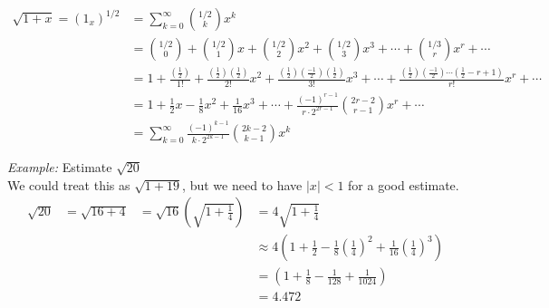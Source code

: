 \documentclass[12pt]{article}
\begin{document}
\begin{align*}
    \sqrt{1+x} =(1_x)^{1/2} &=\sum\limits_{k=0}^\infty\binom{1/2}{k}x^k\\
    &=\binom{1/2}{0}+\binom{1/2}{1}x+\binom{1/2}{2}x^2+\binom{1/2}{3}x^3+\dotsb+\binom{1/3}{r}x^r+\dotsb\\
    &=1+\frac{\left(\frac{1}{2}\right)}{1!}
    +\frac{\left(\frac{1}{2}\right)\left(\frac{1}{2}\right)}{2!}x^2+\frac{\left(\frac{1}{2}\right)\left(\frac{-1}{2}\right)\left(\frac{1}{2}\right)}{3!}x^3+\dotsb+\frac{\left(\frac{1}{2}\right)\left(\frac{-1}{2}\right)\dotsb\left(\frac{1}{2}-r+1\right)}{r!}x^r+\dotsb\\
    &=1+\frac{1}{2}x-\frac{1}{8}x^2+\frac{1}{16}x^3+\dotsb+\frac{(-1)^{r-1}}{r\cdot2^{2r-1}}\binom{2r-2}{r-1}x^r+\dotsb\\
    &=\sum\limits_{k=0}^\infty\frac{(-1)^{k-1}}{k\cdot 2^{2k-1}}\binom{2k-2}{k-1}x^k
\end{align*}

\newpage
{\sl Example:} Estimate $\sqrt{20}$\\
We could treat this as $\sqrt{1+19}$, but we need to have $|x|<1$ for a good estimate.
\begin{align*}
    \sqrt{20} &= \sqrt{16+4} &= \sqrt{16}\left(\sqrt{1+\frac{1}{4}}\right) &=4\sqrt{1+\frac{1}{4}}\\
    &&&\approx 4\left(1+\frac{1}{2}-\frac{1}{8}\left(\frac{1}{4}\right)^2+\frac{1}{16}\left(\frac{1}{4}\right)^3\right)\\
    &&&=\left(1+\frac{1}{8}-\frac{1}{128}+\frac{1}{1024}\right)\\
    &&&=4.472
\end{align*}
\end{document}
